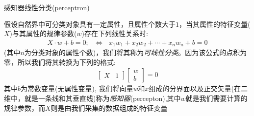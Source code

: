 \documentclass[handout]{ctexbeamer}
\begin{document}
\begin{frame}{感知器线性分类(perceptron)}
	\begin{definition}
	假设自然界中可分类对象具有一定属性，且属性个数大于$1$，当其属性的特征变量($X$)与其属性的规律参数($w$)存在下列线性关系时:
	\begin{align*}
		X \cdot w + b  =0 ; \ \ \ \Leftrightarrow \ \ \ x_1 w_1 + x_2 w_2 + \cdots + x_n w_n + b = 0
	\end{align*}
	(其中$n$为分类对象的属性个数)，我们将其称为\textit{可线性分类}。因为该公式的点积为零，所以我们将其转换为下列的格式:
	\begin{align*}
		\begin{bmatrix}
			X & 1
		\end{bmatrix} \begin{bmatrix}
			w \\
			b
		\end{bmatrix} = 0  
	\end{align*}
	其中$b$为常数变量(无属性变量), 我们将向量$w$和$x$组成的分界面以及正交矢量(在二维中，就是一条线和其垂直线)称为\textit{感知器}(percepton),其中$w$就是我们需要计算的规律参数，而$X$则是由我们采集的数据组成的特征变量
	\end{definition}
\end{frame}
\end{document}
